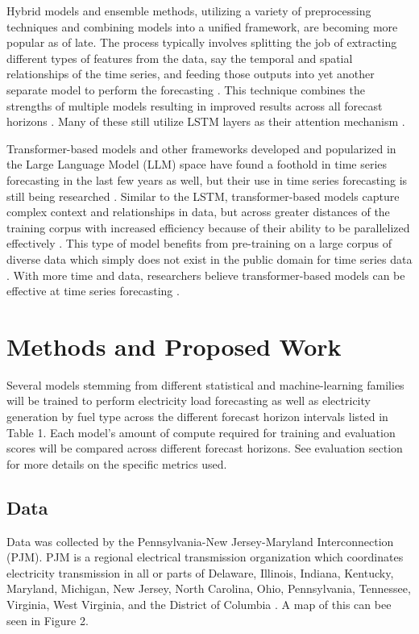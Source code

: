 \documentclass[sigconf]{acmart}
\begin{document}
Hybrid models and ensemble methods, utilizing a variety of preprocessing techniques and combining models into a unified framework, are becoming more popular as of late. The process typically involves splitting the job of extracting different types of features from the data, say the temporal and spatial relationships of the time series, and feeding those outputs into yet another separate model to perform the forecasting \cite{Hua23}. This technique combines the strengths of multiple models resulting in improved results across all forecast horizons \cite{Hua23, Hopf23}. Many of these still utilize LSTM layers as their attention mechanism \cite{Sun22}.

Transformer-based models and other frameworks developed and popularized in the Large Language Model (LLM) space have found a foothold in time series forecasting in the last few years as well, but their use in time series forecasting is still being researched \cite{Zeng22}. Similar to the LSTM, transformer-based models capture complex context and relationships in data, but across greater distances of the training corpus with increased efficiency because of their ability to be parallelized effectively \cite{Zheng24}. This type of model benefits from pre-training on a large corpus of diverse data which simply does not exist in the public domain for time series data \cite{Hug24}. With more time and data, researchers believe transformer-based models can be effective at time series forecasting \cite{Hug24, Zheng24}.

\section{Methods and Proposed Work}
Several models stemming from different statistical and machine-learning families will be trained to perform electricity load forecasting as well as electricity generation by fuel type across the different forecast horizon intervals listed in Table 1. Each model's amount of compute required for training and evaluation scores will be compared across different forecast horizons. See evaluation section for more details on the specific metrics used.

  \subsection{Data}
  Data was collected by the Pennsylvania-New Jersey-Maryland Interconnection (PJM). PJM is a regional electrical transmission organization which coordinates electricity transmission in all or parts of Delaware, Illinois, Indiana, Kentucky, Maryland, Michigan, New Jersey, North Carolina, Ohio, Pennsylvania, Tennessee, Virginia, West Virginia, and the District of Columbia \cite{PJMZone24}. A map of this can bee seen in Figure 2.
  
\end{document}
